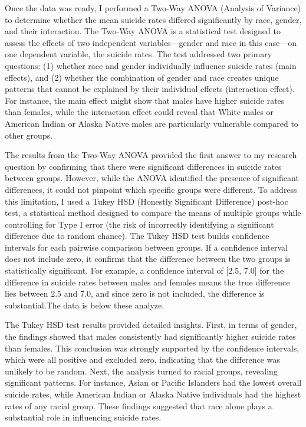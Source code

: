 \documentclass[
  letterpaper,
  DIV=11,
  numbers=noendperiod]{scrartcl}
\begin{document}
Once the data was ready, I performed a Two-Way ANOVA (Analysis of
Variance) to determine whether the mean suicide rates differed
significantly by race, gender, and their interaction. The Two-Way ANOVA
is a statistical test designed to assess the effects of two independent
variables---gender and race in this case---on one dependent variable,
the suicide rates. The test addressed two primary questions: (1) whether
race and gender individually influence suicide rates (main effects), and
(2) whether the combination of gender and race creates unique patterns
that cannot be explained by their individual effects (interaction
effect). For instance, the main effect might show that males have higher
suicide rates than females, while the interaction effect could reveal
that White males or American Indian or Alaska Native males are
particularly vulnerable compared to other groups.

The results from the Two-Way ANOVA provided the first answer to my
research question by confirming that there were significant differences
in suicide rates between groups. However, while the ANOVA identified the
presence of significant differences, it could not pinpoint which
specific groups were different. To address this limitation, I used a
Tukey HSD (Honestly Significant Difference) post-hoc test, a statistical
method designed to compare the means of multiple groups while
controlling for Type I error (the risk of incorrectly identifying a
significant difference due to random chance). The Tukey HSD test builds
confidence intervals for each pairwise comparison between groups. If a
confidence interval does not include zero, it confirms that the
difference between the two groups is statistically significant. For
example, a confidence interval of {[}2.5, 7.0{]} for the difference in
suicide rates between males and females means the true difference lies
between 2.5 and 7.0, and since zero is not included, the difference is
substantial.The data is below these analyze.

The Tukey HSD test results provided detailed insights. First, in terms
of gender, the findings showed that males consistently had significantly
higher suicide rates than females. This conclusion was strongly
supported by the confidence intervals, which were all positive and
excluded zero, indicating that the difference was unlikely to be random.
Next, the analysis turned to racial groups, revealing significant
patterns. For instance, Asian or Pacific Islanders had the lowest
overall suicide rates, while American Indian or Alaska Native
individuals had the highest rates of any racial group. These findings
suggested that race alone plays a substantial role in influencing
suicide rates.
\end{document}
